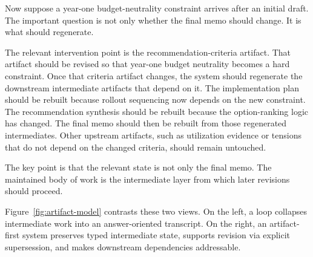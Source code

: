 \documentclass{article}
\begin{document}
Now suppose a year-one budget-neutrality constraint arrives after an initial draft. The important question is not only whether the final memo should change. It is what should regenerate.

The relevant intervention point is the recommendation-criteria artifact. That artifact should be revised so that year-one budget neutrality becomes a hard constraint. Once that criteria artifact changes, the system should regenerate the downstream intermediate artifacts that depend on it. The implementation plan should be rebuilt because rollout sequencing now depends on the new constraint. The recommendation synthesis should be rebuilt because the option-ranking logic has changed. The final memo should then be rebuilt from those regenerated intermediates. Other upstream artifacts, such as utilization evidence or tensions that do not depend on the changed criteria, should remain untouched.

The key point is that the relevant state is not only the final memo. The maintained body of work is the intermediate layer from which later revisions should proceed.

Figure~\ref{fig:artifact-model} contrasts these two views. On the left, a loop collapses intermediate work into an answer-oriented transcript. On the right, an artifact-first system preserves typed intermediate state, supports revision via explicit supersession, and makes downstream dependencies addressable.
\end{document}
